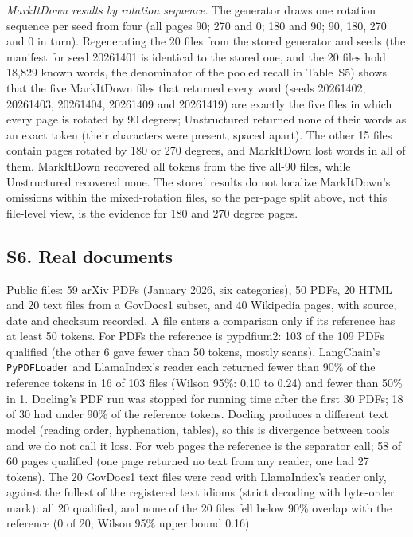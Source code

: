 \emph{MarkItDown results by rotation sequence.} The generator draws one rotation sequence per seed from four (all pages 90; 270 and 0; 180 and 90; 90, 180, 270 and 0 in turn). Regenerating the 20 files from the stored generator and seeds (the manifest for seed 20261401 is identical to the stored one, and the 20 files hold 18,829 known words, the denominator of the pooled recall in Table~S5) shows that the five MarkItDown files that returned every word (seeds 20261402, 20261403, 20261404, 20261409 and 20261419) are exactly the five files in which every page is rotated by 90 degrees; Unstructured returned none of their words as an exact token (their characters were present, spaced apart). The other 15 files contain pages rotated by 180 or 270 degrees, and MarkItDown lost words in all of them. MarkItDown recovered all tokens from the five all-90 files, while Unstructured recovered none. The stored results do not localize MarkItDown's omissions within the mixed-rotation files, so the per-page split above, not this file-level view, is the evidence for 180 and 270 degree pages.


\subsection*{S6. Real documents}
Public files: 59 arXiv PDFs (January 2026, six categories), 50 PDFs, 20 HTML and 20 text files from a GovDocs1 subset, and 40 Wikipedia pages, with source, date and checksum recorded. A file enters a comparison only if its reference has at least 50 tokens. For PDFs the reference is pypdfium2: 103 of the 109 PDFs qualified (the other 6 gave fewer than 50 tokens, mostly scans). LangChain's \texttt{PyPDFLoader} and LlamaIndex's reader each returned fewer than 90\% of the reference tokens in 16 of 103 files (Wilson 95\%: 0.10 to 0.24) and fewer than 50\% in 1. Docling's PDF run was stopped for running time after the first 30 PDFs; 18 of 30 had under 90\% of the reference tokens. Docling produces a different text model (reading order, hyphenation, tables), so this is divergence between tools and we do not call it loss. For web pages the reference is the separator call; 58 of 60 pages qualified (one page returned no text from any reader, one had 27 tokens). The 20 GovDocs1 text files were read with LlamaIndex's reader only, against the fullest of the registered text idioms (strict decoding with byte-order mark): all 20 qualified, and none of the 20 files fell below 90\% overlap with the reference (0 of 20; Wilson 95\% upper bound 0.16).

